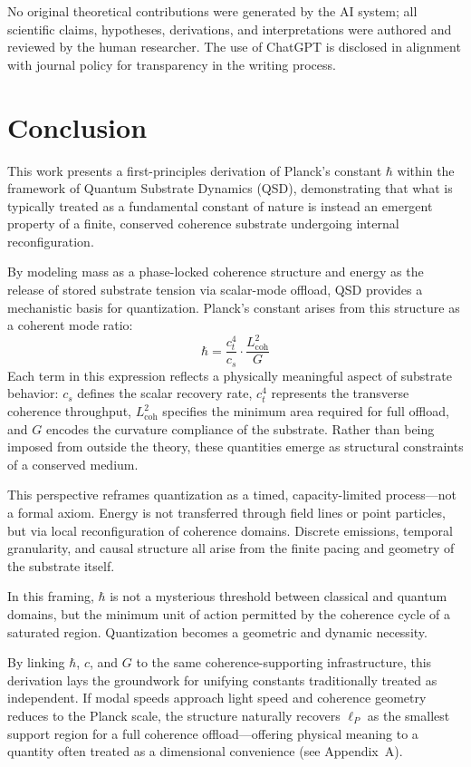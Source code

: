 \documentclass[ht-mathphys]{ht-fmt}
\theoremstyle{thmstyleone}%
\theoremstyle{thmstyletwo}%
\theoremstyle{thmstylethree}%
\begin{document}
No original theoretical contributions were generated by the AI system; all scientific claims, hypotheses, derivations, and interpretations were authored and reviewed by the human researcher. The use of ChatGPT is disclosed in alignment with journal policy for transparency in the writing process.

\section*{Conclusion}

This work presents a first-principles derivation of Planck’s constant \( \hbar \) within the framework of Quantum Substrate Dynamics (QSD), demonstrating that what is typically treated as a fundamental constant of nature is instead an emergent property of a finite, conserved coherence substrate undergoing internal reconfiguration.

By modeling mass as a phase-locked coherence structure and energy as the release of stored substrate tension via scalar-mode offload, QSD provides a mechanistic basis for quantization. Planck’s constant arises from this structure as a coherent mode ratio:
\[
\hbar = \frac{c_t^4}{c_s} \cdot \frac{L_{\text{coh}}^2}{G}
\]
Each term in this expression reflects a physically meaningful aspect of substrate behavior: \( c_s \) defines the scalar recovery rate, \( c_t^4 \) represents the transverse coherence throughput, \( L_{\text{coh}}^2 \) specifies the minimum area required for full offload, and \( G \) encodes the curvature compliance of the substrate. Rather than being imposed from outside the theory, these quantities emerge as structural constraints of a conserved medium.

This perspective reframes quantization as a timed, capacity-limited process—not a formal axiom. Energy is not transferred through field lines or point particles, but via local reconfiguration of coherence domains. Discrete emissions, temporal granularity, and causal structure all arise from the finite pacing and geometry of the substrate itself.

In this framing, \( \hbar \) is not a mysterious threshold between classical and quantum domains, but the minimum unit of action permitted by the coherence cycle of a saturated region. Quantization becomes a geometric and dynamic necessity.

By linking \( \hbar \), \( c \), and \( G \) to the same coherence-supporting infrastructure, this derivation lays the groundwork for unifying constants traditionally treated as independent. If modal speeds approach light speed and coherence geometry reduces to the Planck scale, the structure naturally recovers \( \ell_P \) as the smallest support region for a full coherence offload—offering physical meaning to a quantity often treated as a dimensional convenience (see Appendix~A).
\end{document}
